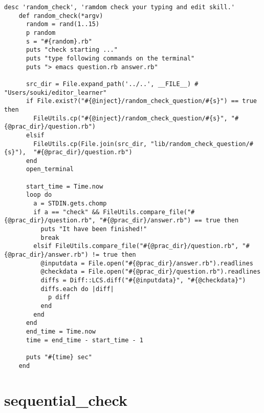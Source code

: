 \begin{verbatim}
desc 'random_check', 'ramdom check your typing and edit skill.'
    def random_check(*argv)
      random = rand(1..15)
      p random
      s = "#{random}.rb"
      puts "check starting ..."
      puts "type following commands on the terminal"
      puts "> emacs question.rb answer.rb"

      src_dir = File.expand_path('../..', __FILE__) # "Users/souki/editor_learner"
      if File.exist?("#{@inject}/random_check_question/#{s}") == true then
        FileUtils.cp("#{@inject}/random_check_question/#{s}", "#{@prac_dir}/question.rb")
      elsif
        FileUtils.cp(File.join(src_dir, "lib/random_check_question/#{s}"),  "#{@prac_dir}/question.rb")
      end
      open_terminal
      
      start_time = Time.now
      loop do
        a = STDIN.gets.chomp
        if a == "check" && FileUtils.compare_file("#{@prac_dir}/question.rb", "#{@prac_dir}/answer.rb") == true then
          puts "It have been finished!"
          break
        elsif FileUtils.compare_file("#{@prac_dir}/question.rb", "#{@prac_dir}/answer.rb") != true then
          @inputdata = File.open("#{@prac_dir}/answer.rb").readlines
          @checkdata = File.open("#{@prac_dir}/question.rb").readlines
          diffs = Diff::LCS.diff("#{@inputdata}", "#{@checkdata}")
          diffs.each do |diff|
            p diff
          end
        end
      end
      end_time = Time.now
      time = end_time - start_time - 1
      
      puts "#{time} sec"
    end
\end{verbatim}

    \section{sequential\_check}\label{sequential_check}


